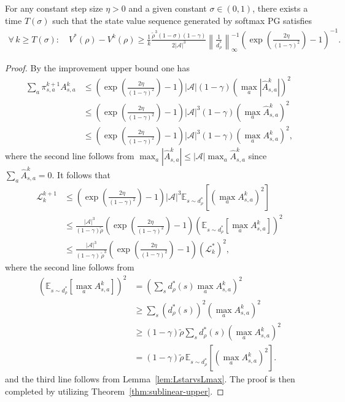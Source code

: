 \begin{theorem}\label{thm:softmaxPG-sublinear-lowers}
For any  constant step size $\eta>0$ and a given constant $\sigma\in(0,1)$, there exists a time $T(\sigma)$ such that the state value sequence generated by softmax PG satisfies
\begin{align*}
\forall\,k\geq T(\sigma):\quad V^*(\rho) - V^k(\rho)\geq \frac{1}{k}\frac{\tilde{\rho}^3(1-\sigma)(1-\gamma)}{2|\mathcal{A}|^3}\left\|\frac{1}{d_\rho^*}\right\|_\infty^{-1}\left(\exp\left(\frac{2\eta}{(1-\gamma)^2}\right)-1\right)^{-1}.
\end{align*}
\end{theorem}
\begin{proof}
    By the improvement upper bound one has 
\begin{align*}
\sum_a\pi^{k+1}_{s,a}A^k_{s,a}&\leq \left(\exp\left(\frac{2\eta}{(1-\gamma)^2}\right)-1\right)|\mathcal{A}|(1-\gamma)\left(\max_a|\hat{A}^k_{s,a}|\right)^2\\
&\leq  \left(\exp\left(\frac{2\eta}{(1-\gamma)^2}\right)-1\right)|\mathcal{A}|^3(1-\gamma)\left(\max_a\hat{A}^k_{s,a}\right)^2\\
&\leq \left(\exp\left(\frac{2\eta}{(1-\gamma)^2}\right)-1\right)|\mathcal{A}|^3(1-\gamma)\left(\max_a{A}^k_{s,a}\right)^2,
\end{align*}
where the second line follows from $\max_a|\hat{A}^k_{s,a}|\leq |\mathcal{A}|\max_a\hat{A}^k_{s,a}$ since $\sum_a\hat{A}^k_{s,a}=0$. It follows that 
\begin{align*}
\mathcal{L}_k^{k+1}&\leq \left(\exp\left(\frac{2\eta}{(1-\gamma)^2}\right)-1\right)|\mathcal{A}|^3\mathbb{E}_{s\sim d_\rho^*}\left[\left(\max_a{A}^k_{s,a}\right)^2\right]\\
&\leq \frac{|\mathcal{A}|^3}{(1-\gamma)\tilde{\rho}}\left(\exp\left(\frac{2\eta}{(1-\gamma)^2}\right)-1\right)\left(\mathbb{E}_{s\sim d_\rho^*}\left[\max_a{A}^k_{s,a}\right]\right)^2\\
&\leq \frac{|\mathcal{A}|^3}{(1-\gamma)\,\tilde{\rho}^3}\left(\exp\left(\frac{2\eta}{(1-\gamma)^2}\right)-1\right)\left(\mathcal{L}_k^*\right)^2,
\end{align*}
where the second line follows from 
\begin{align*}
\left(\mathbb{E}_{s\sim d_\rho^*}\left[\max_a A^k_{s,a}\right]\right)^2&=\left(\sum_sd_\rho^*(s)\max_aA^k_{s,a}\right)^2\\
&\geq\sum_s (d_\rho^*(s))^2\left(\max_a A^k_{s,a}\right)^2\\
&\geq (1-\gamma)\tilde{\rho}\sum_sd_\rho^*(s)\left(\max_a A^k_{s,a}\right)^2\\
&=(1-\gamma)\tilde{\rho}\,\mathbb{E}_{s\sim d_\rho^*}\left[\left(\max_a A^k_{s,a}\right)^2\right].
\end{align*}
and the third line follows from Lemma~\ref{lem:LstarvsLmax}.
The proof is then completed by utilizing Theorem~\ref{thm:sublinear-upper}.
\end{proof}
